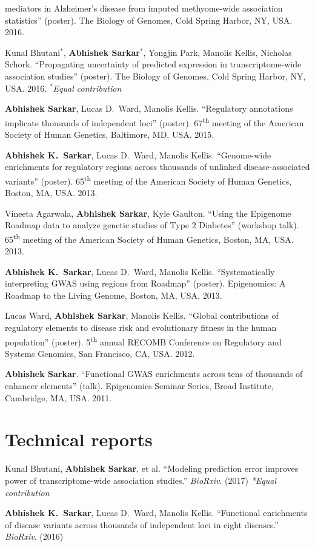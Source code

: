 \documentclass{article}
\begin{document}
\begin{henum}
  mediators in Alzheimer’s disease from imputed methyome-wide association
  statistics'' (poster). The Biology of Genomes, Cold Spring Harbor, NY, USA.
  2016.
\item Kunal Bhutani$^*$, \textbf{Abhishek Sarkar}$^*$, Yongjin Park, Manolis
  Kellis, Nicholas Schork. ``Propagating uncertainty of predicted expression in
  transcriptome-wide association studies'' (poster). The Biology of Genomes,
  Cold Spring Harbor, NY, USA. 2016. \emph{$^*$Equal contribution}
\item \textbf{Abhishek Sarkar}, Lucas D.\ Ward, Manolis Kellis.
  ``Regulatory annotations implicate thousands of independent loci'' (poster).
  67\textsuperscript{th} meeting of the American Society of Human Genetics,
  Baltimore, MD, USA. 2015.
\item \textbf{Abhishek K.\ Sarkar}, Lucas D.\ Ward, Manolis
  Kellis. ``Genome-wide enrichments for regulatory regions across thousands of
  unlinked disease-associated variants'' (poster). 65\textsuperscript{th}
  meeting of the American Society of Human Genetics, Boston, MA, USA. 2013.
\item Vineeta Agarwala, \textbf{Abhishek Sarkar}, Kyle Gaulton. ``Using the
  Epigenome Roadmap data to analyze genetic studies of Type 2 Diabetes''
  (workshop talk). 65\textsuperscript{th} meeting of the American Society of
  Human Genetics, Boston, MA, USA. 2013.
\item \textbf{Abhishek K.\ Sarkar}, Lucas D.\ Ward, Manolis
  Kellis. ``Systematically interpreting GWAS using regions from Roadmap''
  (poster). Epigenomics: A Roadmap to the Living Genome, Boston, MA, USA. 2013.
\item Lucas Ward, \textbf{Abhishek Sarkar}, Manolis Kellis. ``Global
  contributions of regulatory elements to disease risk and evolutionary fitness
  in the human population'' (poster). 5\textsuperscript{th} annual RECOMB
  Conference on Regulatory and Systems Genomics, San Francisco, CA, USA. 2012.
\item \textbf{Abhishek Sarkar}. ``Functional GWAS enrichments across tens of
  thousands of enhancer elements'' (talk). Epigenomics Seminar Series, Broad
  Institute, Cambridge, MA, USA. 2011.
\end{henum}

\section*{Technical reports}
\begin{henum}
\item Kunal Bhutani, \textbf{Abhishek Sarkar}, et al. ``Modeling prediction
  error improves power of transcriptome-wide association studies.''
  \emph{BioRxiv}. (2017) \emph{*Equal contribution}
\item \textbf{Abhishek K.\ Sarkar}, Lucas D.\ Ward, Manolis Kellis.
  ``Functional enrichments of disease variants across thousands of independent
  loci in eight diseases.'' \emph{BioRxiv}. (2016)
\end{henum}
\end{document}
